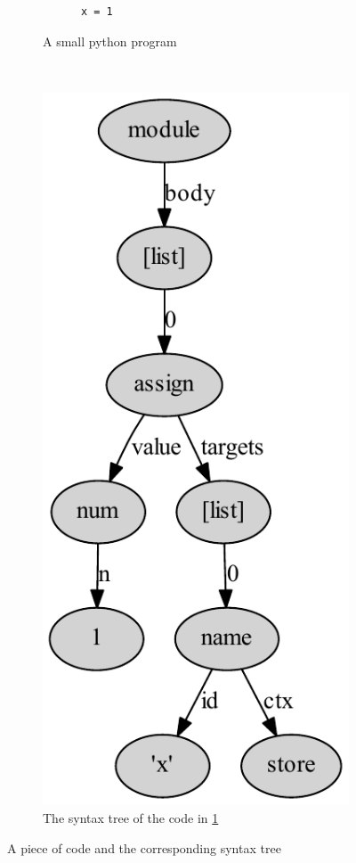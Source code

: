 \begin{figure}
  
  \begin{subfigure}[b]{0.5\textwidth}
    \begin{lstlisting}
      x = 1
    \end{lstlisting}
    \caption{A small python program}
    \label{ast_code}
  \end{subfigure}
  ~
  \begin{subfigure}[b]{0.5\textwidth}
    \includegraphics[scale=0.7]{figures/simple_ast.pdf}
    \caption{The syntax tree of the code in \cref{ast_code}}
  \end{subfigure}
  
  \caption{A piece of code and the corresponding syntax tree}
  \label{ast_example}
\end{figure}
